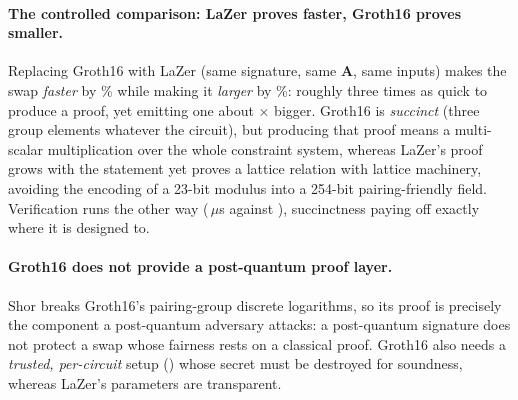 \paragraph{The controlled comparison: LaZer proves faster, Groth16 proves smaller.} Replacing Groth16
with LaZer (same signature, same $\mathbf{A}$, same inputs) makes the swap
\emph{faster} by \cmpTimePctAbs{}\% while making it \emph{larger} by
\cmpBytesPctAbs{}\%: roughly three times as quick to produce a proof, yet emitting one about
\stageTwoProofSizeRatio{}$\times$ bigger. Groth16 is \emph{succinct} (three group
elements whatever the circuit), but producing that proof means a multi-scalar
multiplication over the whole constraint system, whereas LaZer's proof grows with the
statement yet proves a lattice relation with lattice machinery, avoiding the encoding of
a 23-bit modulus into a 254-bit pairing-friendly field. Verification runs the other way
(\cfgTwoProofVerifyMean{}\,$\mu$s against \cfgThreeProofVerifyMean{}), succinctness
paying off exactly where it is designed to.

\paragraph{Groth16 does not provide a post-quantum proof layer.} Shor breaks Groth16's
pairing-group discrete logarithms, so its proof is precisely the component a
post-quantum adversary attacks: a
post-quantum signature does not protect a swap whose fairness rests on a classical proof.
Groth16 also needs a \emph{trusted, per-circuit} setup (\cfgTwoSetupTime{}) whose secret
must be destroyed for soundness, whereas LaZer's parameters are transparent.

